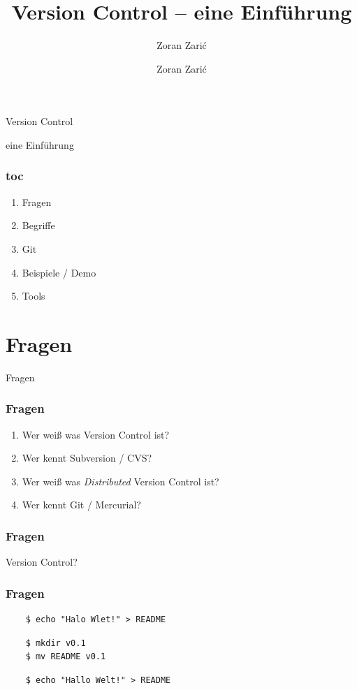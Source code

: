 \documentclass[]{beamer}
\begin{document}

\title[Version Control]{Version Control -- eine Einführung}
\subtitle[Zoran Zari\'c]{Zoran Zari\'c}
\author[Zoran Zari\'c]{Zoran Zari\'c}

\begin{frame}
	\fontsize{30}{10}\selectfont Version Control
	\vspace*{0.5cm}

	\fontsize{20}{10}\selectfont eine Einführung
	\only<2>{
		(Ja, mit Git)
	}
\end{frame}

\begin{frame}
	\frametitle{toc}
	\begin{enumerate}
		\item
			Fragen
		\item
			Begriffe
		\item
			Git
		\item
			Beispiele / Demo
		\item
			Tools
	\end{enumerate}
\end{frame}

\section{Fragen}
\begin{frame}
	\fontsize{30}{10}\selectfont Fragen
\end{frame}

\begin{frame}
	\frametitle{Fragen}
	\begin{enumerate}
		\item<1->
			Wer weiß was Version Control ist?
		\item<2->
			Wer kennt Subversion / CVS?
		\item<3->
			Wer weiß was \emph{Distributed} Version Control ist?
		\item<4->
			Wer kennt Git / Mercurial?

	\end{enumerate}
\end{frame}

\begin{frame}
	\frametitle{Fragen}
	\Huge{Version Control?}\\
\end{frame}

\begin{frame}[fragile]
	\frametitle{Fragen}
	\begin{verbatim}
	$ echo "Halo Wlet!" > README
	\end{verbatim}

	\begin{verbatim}
	$ mkdir v0.1
	$ mv README v0.1
	\end{verbatim}

	\begin{verbatim}
	$ echo "Hallo Welt!" > README
	\end{verbatim}
\end{frame}
\end{document}
